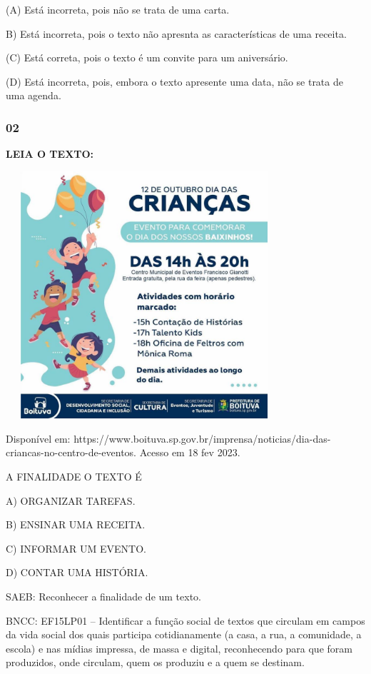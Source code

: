 (A) Está incorreta, pois não se trata de uma carta.

B) Está incorreta, pois o texto não apresnta as características de uma receita.

(C) Está correta, pois o texto é um convite para um aniversário.

(D) Está incorreta, pois, embora o texto apresente uma data, não se trata de uma agenda.

\subsubsection{02 }\label{section-13}

\textbf{LEIA O TEXTO:}

\includegraphics[width=4.03663in,height=3.60910in]{media/image158.jpg}

Disponível
em: https://www.boituva.sp.gov.br/imprensa/noticias/dia-das-criancas-no-centro-de-eventos.
Acesso em 18 fev 2023.

A FINALIDADE O TEXTO É

A) ORGANIZAR TAREFAS.

B) ENSINAR UMA RECEITA.

C) INFORMAR UM EVENTO.

D) CONTAR UMA HISTÓRIA.

SAEB: Reconhecer a finalidade de um texto.

BNCC: EF15LP01 -- Identificar a função social de textos que
circulam em campos da vida social dos quais participa cotidianamente (a
casa, a rua, a comunidade, a escola) e nas mídias impressa, de massa e
digital, reconhecendo para que foram produzidos, onde circulam, quem os
produziu e a quem se destinam.

